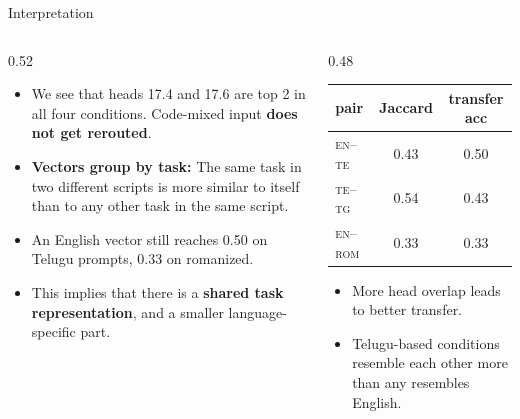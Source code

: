 \documentclass[aspectratio=169,11pt]{beamer}
\newcommand{\tight}{\setlength{\itemsep}{2pt plus 1pt minus 1pt}}
\newcommand{\cond}[1]{\textsc{#1}}
\begin{document}
\begin{frame}{Interpretation}
  \begin{columns}[T]
    \begin{column}{0.52\textwidth}
      \begin{itemize}\small\tight
        \item We see that heads 17.4 and 17.6 are top 2 in all four
              conditions. Code-mixed input \textbf{does not get rerouted}.
        \vspace{1.5mm}
        \item \textbf{Vectors group by task:} The same task in two different scripts is more
              similar to itself than to any other task in the same script.
        \vspace{1.5mm}
        \item An English vector
              still reaches 0.50 on Telugu prompts, 0.33 on romanized.
        \vspace{1.5mm}
        \item This implies that there is a \textbf{shared task representation}, and a smaller
              language-specific part.
      \end{itemize}
    \end{column}
    \begin{column}{0.48\textwidth}
      \centering
      \vspace{2mm}
      {\footnotesize\setlength{\tabcolsep}{5pt}
      \begin{tabular}{lcc}
        \toprule
        pair & Jaccard & transfer acc \\
        \midrule
        \cond{en}--\cond{te}  & 0.43 & 0.50 \\
        \cond{te}--\cond{tg}  & 0.54 & 0.43 \\
        \cond{en}--\cond{rom} & 0.33 & 0.33 \\
        \bottomrule
      \end{tabular}}
      \vspace{3mm}
      \begin{itemize}\footnotesize\tight
        \item More head overlap leads to better transfer.
        \item Telugu-based conditions resemble each other more than any
              resembles English.
      \end{itemize}
    \end{column}
  \end{columns}
\end{frame}
\end{document}
